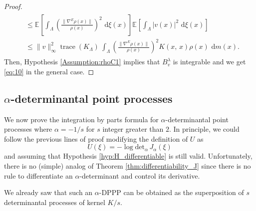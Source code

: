 \documentclass[11pt,a4paper]{amsart}
\begin{document}
\begin{proof}
\begin{multline*}
    \begin{aligned}
      & \le {{\mathbb E}_{{}}\left[{{\int_\Lambda
        \left(\frac{\|\nabla^E\rho(x)\|}{\rho(x)}\right)^2{\text{ d}}\xi(x)}}\right]}{{\mathbb E}_{{}}\left[{{\int_\Lambda
        |v(x)|^2{\text{ d}}\xi(x)}}\right]}
      \\
      &\le \|v\|_\infty^2 {\operatorname{trace}}(K_\Lambda)\ \int_\Lambda
      \left(\frac{\|\nabla^E\rho(x)\|}{\rho(x)}\right)^2K(x,\,
      x)\rho(x){\text{ d}} m(x).
    \end{aligned}
  \end{multline*}
  Then, Hypothesis \ref{Assumption:rhoC1} implies that $B^\lambda_v$
  is integrable and we get \eqref{eq:10} in the general case.
\end{proof}
\subsection{$\alpha$-determinantal point processes}
\label{sec:alpha-determ-point}
We now prove the integration by parts formula for
$\alpha$-determinantal point processes where $\alpha=-1/s$ for $s$
integer greater than $2$. In principle, we could follow the previous
lines of proof modifying the definition of $U$ as
\begin{equation*}
  U(\xi)=-\log{{\text{det}}}_\alpha\, J_\alpha(\xi)
\end{equation*}
and assuming that Hypothesis \ref{hyp:H_differentiable} is still
valid. Unfortunately, there is no (simple) analog of Theorem
\ref{thm:differentiability_J} since there is no rule to differentiate
an $\alpha$-determinant and control its derivative.

We already saw that such an $\alpha$-DPPP can be obtained as the
superposition of $s$ determinantal processes of kernel $K/s$.
\end{document}
